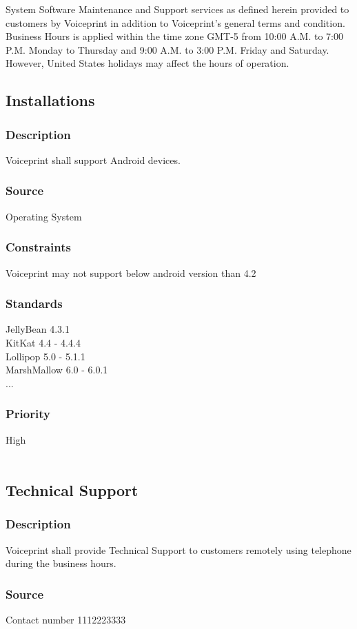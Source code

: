 System Software Maintenance and Support services as defined herein provided to customers by Voiceprint in addition to Voiceprint's general terms and condition. Business Hours is applied within the time zone GMT-5 from 10:00 A.M. to 7:00 P.M. Monday to Thursday and 9:00 A.M. to 3:00 P.M. Friday and Saturday. However, United States holidays may affect the hours of operation.


\subsection{Installations}
\subsubsection{Description}
Voiceprint shall support Android devices.
\subsubsection{Source}
Operating System
\subsubsection{Constraints}
Voiceprint may not support below android version than 4.2 
\subsubsection{Standards}
JellyBean 4.3.1 \\
KitKat 4.4 - 4.4.4 \\
Lollipop 5.0 - 5.1.1 \\
MarshMallow 6.0 - 6.0.1 \\
...
\subsubsection{Priority}
High
\\
\\
\subsection{Technical Support}
\subsubsection{Description}
Voiceprint shall provide Technical Support to customers remotely using telephone during the business hours.
\subsubsection{Source}
Contact number 1112223333
